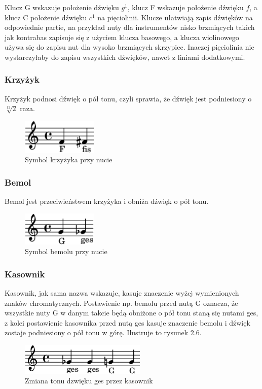 \documentclass[printmode, eng, openany]{mgr}
\newcommand\tab[1][1cm]{\hspace*{#1}}
\begin{document}
\tab Klucz G wskazuje położenie dźwięku $g^{1}$, klucz F wskazuje położenie dźwięku $f$, a klucz C położenie dźwięku $c^{1}$ na pięciolinii. Klucze ułatwiają zapis dźwięków na odpowiednie partie, na przykład nuty dla instrumentów nisko brzmiących takich jak kontrabas zapisuje się z użyciem klucza basowego, a klucza wiolinowego używa się do zapisu nut dla wysoko brzmiących skrzypiec. Inaczej pięciolinia nie wystarczyłaby do zapisu wszystkich dźwięków, nawet z liniami dodatkowymi.

\subsubsection{Krzyżyk}
\tab Krzyżyk podnosi dźwięk o pół tonu, czyli sprawia, że dźwięk jest podniesiony o $\sqrt[12]{2}$ raza.
\begin{figure}[!htb]
\centering
\includegraphics[width=3.6cm]{krzyzyk.png}
\caption{Symbol krzyżyka przy nucie}
\end{figure}

\subsubsection{Bemol}
\tab Bemol jest przeciwieństwem krzyżyka i obniża dźwięk o pół tonu.
\begin{figure}[!htb]
\centering
\includegraphics[width=3.6cm]{bemol.png}
\caption{Symbol bemolu przy nucie}
\end{figure}

\subsubsection{Kasownik}
\tab Kasownik, jak sama nazwa wskazuje, kasuje znaczenie wyżej wymienionych znaków chromatycznych. Postawienie np. bemolu przed nutą G oznacza, że wszystkie nuty G w danym takcie będą obniżone o pół tonu staną się nutami ges, z kolei postawienie kasownika przed nutą ges kasuje znaczenie bemolu i dźwięk zostaje podniesiony o pół tonu w górę. Ilustruje to rysunek 2.6.

\begin{figure}[!htb]
\centering
\includegraphics[width=6cm]{kasownik_poj}
\caption{Zmiana tonu dzwięku ges przez kasownik}
\end{figure}
\end{document}
